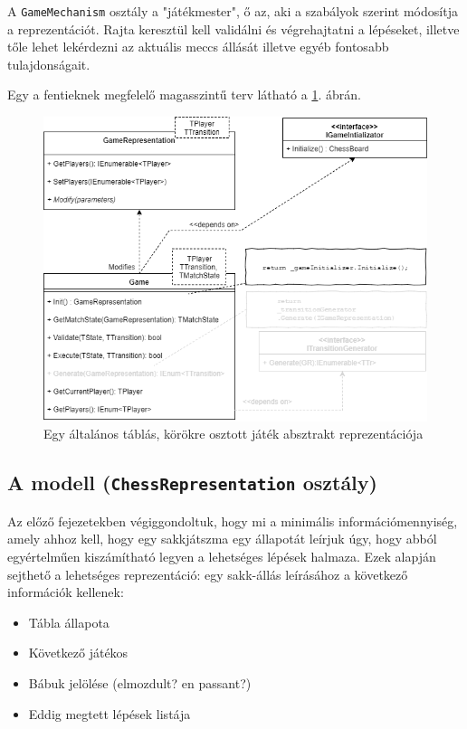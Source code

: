 \documentclass[twoside, a4paper, 12pt]{book}
\begin{document}
A \texttt{GameMechanism} osztály a "játékmester", ő az, aki a szabályok szerint módosítja a reprezentációt. Rajta keresztül kell validálni és végrehajtatni a lépéseket, illetve tőle lehet lekérdezni az aktuális meccs állását illetve egyéb fontosabb tulajdonságait. 

Egy a fentieknek megfelelő magasszintű terv látható a \ref{fig:boardGameAbstractClassDiagram}. ábrán.

\begin{figure}[htbp]
	\centering
	\includegraphics[width=1.0\textwidth]{img/boardGameAbstractClassDiagram.png}
	\caption{Egy általános táblás, körökre osztott játék absztrakt reprezentációja}
	\label{fig:boardGameAbstractClassDiagram}
\end{figure}

\subsection{A modell (\texttt{ChessRepresentation} osztály)}
Az előző fejezetekben végiggondoltuk, hogy mi a minimális információmennyiség, amely ahhoz kell, hogy egy sakkjátszma egy állapotát leírjuk úgy, hogy abból egyértelműen kiszámítható legyen a lehetséges lépések halmaza. Ezek alapján sejthető a lehetséges reprezentáció: egy sakk-állás leírásához a következő információk kellenek:
\begin{itemize}
	\item Tábla állapota
	\item Következő játékos
	\item Bábuk jelölése (elmozdult? en passant?)
	\item Eddig megtett lépések listája
\end{itemize}
\end{document}
